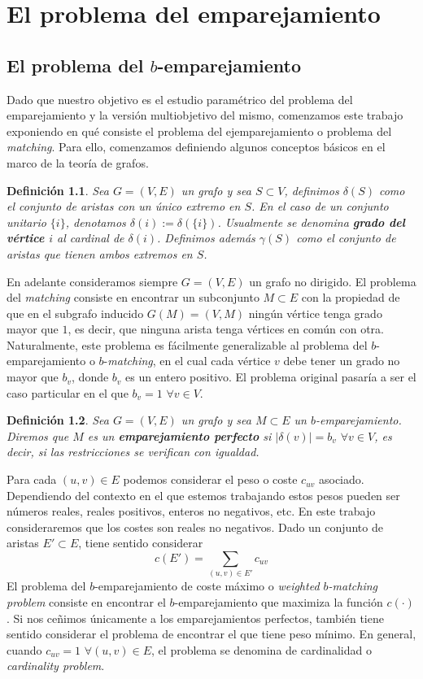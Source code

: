 \documentclass[twoside,a4paper,openright,12pt,tikz]{book}
\newtheorem{defi}{Definici\'on}[section]
\begin{document}
\chapter{El problema del emparejamiento}

\section{El problema del $b$-emparejamiento}
Dado que nuestro objetivo es el estudio paramétrico del problema del emparejamiento y la versión multiobjetivo del mismo, comenzamos este trabajo exponiendo en qué consiste el problema del ejemparejamiento o problema del \textit{matching}. Para ello, comenzamos definiendo algunos conceptos básicos en el marco de la teoría de grafos.
\begin{defi}
Sea $G=(V,E)$ un grafo y sea $S \subset V$, definimos $\delta(S)$ como el conjunto de aristas con un único extremo en $S$. En el caso de un conjunto unitario $\{i\}$, denotamos $\delta(i):=\delta(\{i\})$. Usualmente se denomina \textbf{grado del vértice $i$} al cardinal de $\delta(i)$. Definimos además $\gamma(S)$ como el conjunto de aristas que tienen ambos extremos en $S$.
\end{defi}

En adelante consideramos siempre $G=(V,E)$ un grafo no dirigido. El problema del \textit{matching} consiste en encontrar un subconjunto $M\subset E$ con la propiedad de que en el subgrafo inducido $G(M)=(V,M)$ ningún vértice tenga grado mayor que $1$, es decir, que ninguna arista tenga vértices en común con otra. Naturalmente, este problema es fácilmente generalizable al problema del $b$-emparejamiento o $b$-\textit{matching}, en el cual cada vértice $v$ debe tener un grado no mayor que $b_v$, donde $b_v$ es un entero positivo. El problema original pasaría a ser el caso particular en el que $b_v = 1$ $\forall v \in V$.

\begin{defi}
Sea $G=(V,E)$ un grafo y sea $M\subset E$ un $b$-emparejamiento. Diremos que $M$ es un \textbf{emparejamiento perfecto} si $|\delta(v)|=b_v$ $\forall v \in V$, es decir, si las restricciones se verifican con igualdad.
\end{defi}
Para cada $(u,v)\in E$ podemos considerar el peso o coste $c_{uv}$ asociado. Dependiendo del contexto en el que estemos trabajando estos pesos pueden ser números reales, reales positivos, enteros no negativos, etc. En este trabajo consideraremos que los costes son reales no negativos. Dado un conjunto de aristas $E'\subset E$, tiene sentido considerar
$$
c(E')=\sum_{(u,v)\in E'} c_{uv}
$$
El problema del $b$-emparejamiento de coste máximo o \textit{weighted $b$-matching problem} consiste en encontrar el $b$-emparejamiento que maximiza la función $c(\cdot)$. Si nos ceñimos únicamente a los emparejamientos perfectos, también tiene sentido considerar el problema de encontrar el que tiene peso mínimo. En general, cuando $c_{uv}=1$ $\forall (u,v)\in E$, el problema se denomina de cardinalidad o \textit{cardinality problem}.
\end{document}
